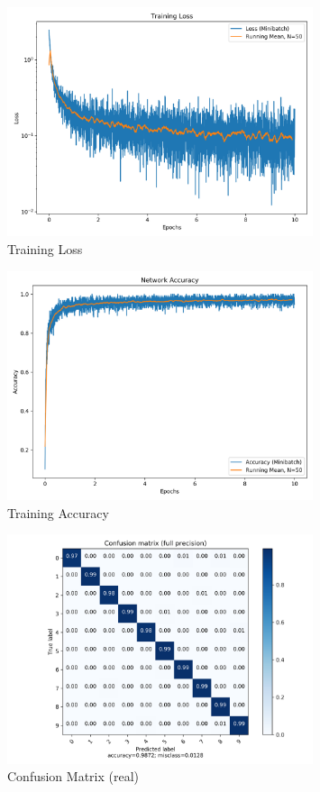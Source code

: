 \begin{figure}[htbp]
	\centering
	\includegraphics[width=0.8\textwidth]{../../net/images/training_loss}
	\caption{Training Loss}
	\label{fig:network-train-loss}
\end{figure}

\begin{figure}[htbp]
	\centering
	\includegraphics[width=0.8\textwidth]{../../net/images/training_accuracy}
	\caption{Training Accuracy}
	\label{fig:network-train-acc}
\end{figure}

\begin{figure}[htbp]
	\centering
	\includegraphics[width=0.8\textwidth]{../../net/images/cm}
	\caption{Confusion Matrix (real)}
	\label{fig:network-test-cm}
\end{figure}

